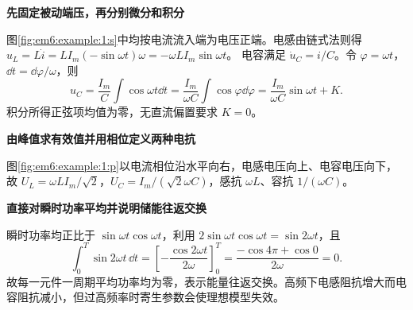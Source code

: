 \begin{solution}\textbf{先固定被动端压，再分别微分和积分}\par\nobreak
图\ref{fig:em6:example:1:s}中均按电流流入端为电压正端。电感由链式法则得
$u_L=L\dot i=LI_m(-\sin\omega t)\omega=-\omega LI_m\sin\omega t$。
电容满足 $\dot u_C=i/C$。令 $\varphi=\omega t$，$\dd t=\dd\varphi/\omega$，则
\[
 u_C=\frac{I_m}{C}\int\cos\omega t\dd t
 =\frac{I_m}{\omega C}\int\cos\varphi\dd\varphi
 =\frac{I_m}{\omega C}\sin\omega t+K.
\]
积分所得正弦项均值为零，无直流偏置要求 $K=0$。



\par\medskip{}\noindent\textbf{由峰值求有效值并用相位定义两种电抗}\par\nobreak
图\ref{fig:em6:example:1:p}以电流相位沿水平向右，电感电压向上、电容电压向下，故 $U_L=\omega LI_m/\sqrt2$，$U_C=I_m/(\sqrt2\omega C)$，感抗 $\omega L$、容抗 $1/(\omega C)$。

\par\medskip{}\noindent\textbf{直接对瞬时功率平均并说明储能往返交换}\par\nobreak
瞬时功率均正比于 $\sin\omega t\cos\omega t$，利用 $2\sin\omega t\cos\omega t=\sin2\omega t$，且
\[
\int_0^T\sin2\omega t\,\dd t
=\left[-\frac{\cos2\omega t}{2\omega}\right]_0^T
=\frac{-\cos4\pi+\cos0}{2\omega}=0.
\]
故每一元件一周期平均功率均为零，表示能量往返交换。高频下电感阻抗增大而电容阻抗减小，但过高频率时寄生参数会使理想模型失效。\end{solution}
